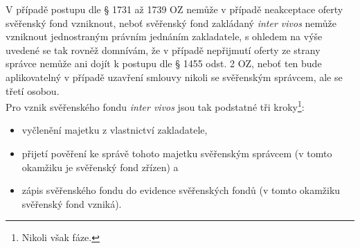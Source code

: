 \documentclass{article}
\begin{document}
V případě postupu dle § 1731 až 1739 OZ nemůže v případě neakceptace oferty svěřenský fond vzniknout, neboť svěřenský fond zakládaný \textit{inter vivos} nemůže vzniknout jednostraným právním jednáním zakladatele, s ohledem na výše uvedené se tak rovněž domnívám, že v případě nepřijmutí oferty ze strany správce nemůže ani dojít k postupu dle § 1455 odst. 2 OZ, neboť ten bude aplikovatelný v případě uzavření smlouvy nikoli se svěřenským správcem, ale se třetí osobou.\\

Pro vznik svěřenského fondu \textit{inter vivos} jsou tak podstatné tři kroky\footnote{Nikoli však fáze.}: \\

\begin{itemize}
\item vyčlenění majetku z vlastnictví zakladatele,
\item přijetí pověření ke správě tohoto majetku svěřenským správcem (v tomto okamžiku je svěřenský fond zřízen) a
\item zápis svěřenského fondu do evidence svěřenských fondů (v tomto okamžiku svěřenský fond vzniká).\\	
\end{itemize}
\end{document}
